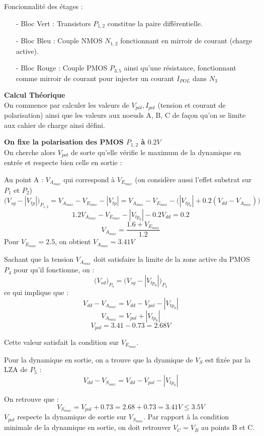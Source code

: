 \documentclass[11pt]{article}
\begin{document}
Foncionnalit\'e des \'etages :
\begin{itemize} \itemsep -2pt
\item[-] Bloc Vert : Transistors $P_{1,2}$ constitue la paire diff\'erentielle.
\item[-] Bloc Bleu : Couple NMOS $N_{1,2}$ fonctionnant en mirroir de courant (charge active).
\item[-] Bloc Rouge : Couple PMOS $P_{3,5}$ ainsi qu'une r\'esistance, fonctionnant comme mirroir de courant
  pour injecter un courant $I_{POL}$ dans $N_{3}$
\end{itemize}

\textbf{Calcul Th\'eorique}\\
On commence par calculer les valeurs de $V_{pol}, I_{pol}$ (tension et courant de polarisation)
ainsi que les valeurs aux noeuds A, B, C de fa\c con qu'on se limite aux cahier de charge ainsi d\'efini.

\textbf{On fixe la polarisation des PMOS $P_{1,2}$ \`a $0.2 V$}\\
On cherche alors $V_{pol}$ de sorte qu'elle v\'erifie le maximum de la dynamique en entr\'ee et respecte bien
celle en sortie :

\clearpage

Au point A :
$V_{A_{max}}$ qui correspond \`a $V_{E_{max}}$ (on consid\`ere aussi l'effet substrat sur $P_1$ et $P_2$)
\[
\bigg( V_{sg} - | V_{tp} | \bigg)_{P_{1,2}} = V_{A_{max}} - V_{E_{max}} - |V_{tp}| = V_{A_{max}} - V_{E_{max}} -
\Big( | V_{tp_{0}} | + 0.2(V_{dd} - V_{A_{max}})\Big)
\]
\[
1.2V_{A_{max}} - V_{E_{max}} - | V_{tp_{0}} | - 0.2 V_{dd} = 0.2
\]
\[
V_{A_{max}} = \frac{1.6 + V_{E_{max}}}{1.2}
\]
Pour $V_{E_{max}} = 2.5$, on obtient $V_{A_{max}} = 3.41 V$

Sachant que la tension $V_{A_{max}}$ doit satisfaire la limite de la zone active du PMOS $P_4$ pour qu'il
fonctionne, on :
\[
\Big(V_{sd}\Big)_{P_{4}} = \Big(V_{sg} - | V_{tp_{0}} | \Big)_{P_4} 
\]
ce qui implique que : 
\[
V_{dd} - V_{A_{max}} = V_{dd} - V_{pol} - |V_{tp_0}|
\]
\[
V_{A_{max}} = V_{pol} + |V_{tp_0}|
\]
\[
V_{pol} = 3.41 - 0.73 = 2.68 V
\]

Cette valeur satisfait la condition sur $V_{E_{max}}$.

Pour la dynamique en sortie, on a trouve que la dyamique de $V_S$ est fix\'ee par la LZA de $P_5$ :
\[
V_{dd} - V_{S_{max}} = V_{dd} - V_{pol} - |V_{tp_0}|
\]

On retrouve que :
\[
V_{S_{max}} = V_{pol} + 0.73 = 2.68+0.73 = 3.41 V \leq 3.5 V 
\]
$V_{pol}$ respecte la dynamique de sortie sur $V_{S_{max}}$. Par rapport \`a la condition minimale de la
dynamique en sortie, on doit retrouver $V_C = V_B$ au points B et C.
\end{document}

